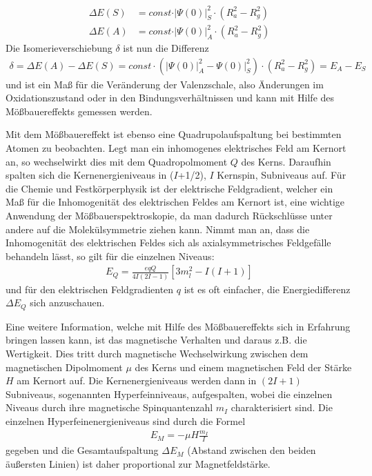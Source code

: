 \documentclass[10pt,twoside]{article}
\renewcommand{\1}{^{-1}}
\renewcommand{\2}{^{-2}}
\newcommand{\3}{^{-3}}
\newcommand{\4}{^{-4}}
\newcommand{\5}{^{-5}}
\newcommand{\6}{^{-6}}
\newcommand{\7}{^{-7}}
\newcommand{\8}{^{-8}}
\newcommand{\9}{^{-9}}
\begin{document}
\newpage
\begin{align*}
\Delta E(S)&=const\cdot \vert \Psi(0)\vert^2_{{S}}\cdot({R}_{{a}}^2-{R}_{{g}}^2) \\
\Delta E(A)&=const\cdot \vert \Psi(0)\vert^2_{{A}}\cdot({R}_{{a}}^2-{R}_{{g}}^2) 
\end{align*}
Die Isomerieverschiebung $\delta$ ist nun die Differenz
\begin{align*}
\delta = \Delta E(A)- \Delta E(S) = const\cdot (\vert \Psi(0)\vert^2_{{A}}-\Psi(0)\vert^2_{{S}})\cdot({R}_{{a}}^2-{R}_{{g}}^2) = {E}_{{A}}-{E}_{{S}}
\end{align*}
und ist ein Maß für die Veränderung der Valenzschale, also Änderungen im Oxidationszustand oder in den Bindungsverhältnissen und kann mit Hilfe des Mößbauereffekts gemessen werden.

Mit dem Mößbauereffekt ist ebenso eine Quadrupolaufspaltung bei bestimmten Atomen zu beobachten. Legt man ein inhomogenes elektrisches Feld am Kernort an, so wechselwirkt dies mit dem Quadropolmoment $Q$ des Kerns. Daraufhin spalten sich die Kernenergieniveaus in ($I$+1/2), $I$ Kernspin, Subniveaus auf. Für die Chemie und Festkörperphysik ist der elektrische Feldgradient, welcher ein Maß für die Inhomogenität des elektrischen Feldes am Kernort ist, eine wichtige Anwendung der Mößbauerspektroskopie, da man dadurch Rückschlüsse unter andere auf die Molekülsymmetrie ziehen kann. Nimmt man an, dass die Inhomogenität des elektrischen Feldes sich als axialsymmetrisches Feldgefälle behandeln lässt, so gilt für die einzelnen Niveaus:
\begin{align*}
E_Q = \frac{eqQ}{4I(2I-1)}[3m_l^2-I(I+1)]
\end{align*}
und für den elektrischen Feldgradienten $q$ ist es oft einfacher, die Energiedifferenz $\Delta E_Q$ sich anzuschauen.

Eine weitere Information, welche mit Hilfe des Mößbauereffekts sich in Erfahrung bringen lassen kann, ist das magnetische Verhalten und daraus z.B. die Wertigkeit. Dies tritt durch magnetische Wechselwirkung zwischen dem magnetischen Dipolmoment $\mu$ des Kerns und einem magnetischen Feld der Stärke $H$ am Kernort auf. Die Kernenergieniveaus werden dann in $(2I+1)$ Subniveaus, sogenannten Hyperfeinniveaus, aufgespalten, wobei die einzelnen Niveaus durch ihre magnetische Spinquantenzahl $m_I$ charakterisiert sind.
Die einzelnen Hyperfeinenergieniveaus sind durch die Formel 
\begin{align*}
E_M = -\mu H \frac{m_I}{I}
\end{align*}
gegeben und die Gesamtaufspaltung $\Delta E_M$ (Abstand
zwischen den beiden äußersten Linien) ist daher proportional zur Magnetfeldstärke.
\end{document}
